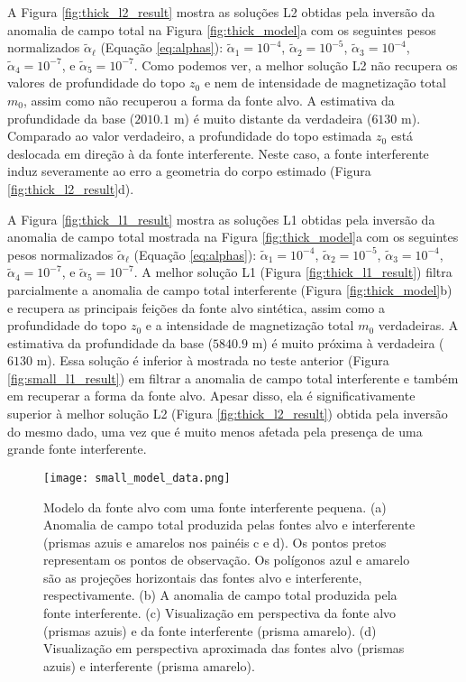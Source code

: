 A Figura \ref{fig:thick_l2_result} mostra as soluções L2 obtidas pela inversão da anomalia de campo total na Figura \ref{fig:thick_model}a
com os seguintes pesos normalizados $\tilde{\alpha}_{\ell}$ (Equação \ref{eq:alphas}):
$\tilde{\alpha}_{1} = 10^{-4}$, $\tilde{\alpha}_{2} = 10^{-5}$, 
$\tilde{\alpha}_{3} = 10^{-4}$, $\tilde{\alpha}_{4} = 10^{-7}$, e 
$\tilde{\alpha}_{5} = 10^{-7}$.
Como podemos ver, a melhor solução L2 não recupera os valores de profundidade do topo $z_{0}$ e nem de intensidade de magnetização total $m_{0}$, assim como não recuperou a forma da fonte alvo.
A estimativa da profundidade da base ($2010.1$ m) é muito distante da verdadeira ($6130$ m).
Comparado ao valor verdadeiro, a profundidade do topo estimada $z_{0}$ está deslocada em direção à da fonte interferente.
Neste caso, a fonte interferente induz severamente ao erro a geometria do corpo estimado (Figura \ref{fig:thick_l2_result}d).

A Figura \ref{fig:thick_l1_result} mostra as soluções L1 obtidas pela inversão da anomalia de campo total mostrada na Figura \ref{fig:thick_model}a
com os seguintes pesos normalizados $\tilde{\alpha}_{\ell}$ (Equação \ref{eq:alphas}):
$\tilde{\alpha}_{1} = 10^{-4}$, $\tilde{\alpha}_{2} = 10^{-5}$, 
$\tilde{\alpha}_{3} = 10^{-4}$, $\tilde{\alpha}_{4} = 10^{-7}$, e 
$\tilde{\alpha}_{5} = 10^{-7}$.
A melhor solução L1 (Figura \ref{fig:thick_l1_result}) filtra parcialmente a anomalia de campo total interferente (Figura \ref{fig:thick_model}b) e recupera as principais feições da fonte alvo sintética, assim como a profundidade do topo $z_{0}$ e a intensidade de magnetização total $m_{0}$ verdadeiras.
A estimativa da profundidade da base ($5840.9$ m) é muito próxima à verdadeira ($6130$ m).
Essa solução é inferior à mostrada no teste anterior (Figura \ref{fig:small_l1_result})
em filtrar a anomalia de campo total interferente e também em recuperar a forma da fonte alvo. 
Apesar disso, ela é significativamente superior à melhor solução L2 (Figura \ref{fig:thick_l2_result}) obtida pela inversão do mesmo dado, uma vez que é muito menos afetada pela presença de uma grande fonte interferente.

\begin{figure}[!htb]
	\centering
	\texttt{[image: small\_model\_data.png]}
	\caption{Modelo da fonte alvo com uma fonte interferente pequena.
		(a) Anomalia de campo total produzida pelas fontes alvo e interferente
		(prismas azuis e amarelos nos painéis c e d). Os pontos pretos representam os pontos de observação. Os polígonos azul e amarelo são as projeções horizontais das fontes alvo e interferente, respectivamente.
		(b) A anomalia de campo total produzida pela fonte interferente. 
		(c) Visualização em perspectiva da fonte alvo (prismas azuis) e da fonte interferente (prisma amarelo). 
		(d) Visualização em perspectiva aproximada das fontes alvo (prismas azuis) e interferente (prisma amarelo).
	}
	\label{fig:small_model}
\end{figure}


